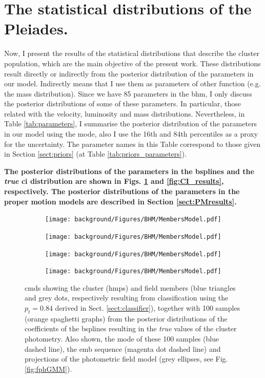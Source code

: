 \section{The statistical distributions of the Pleiades.}
Now, I present the results of the statistical distributions that describe the cluster population, which are the main objective of the present work. These distributions result directly or indirectly from the posterior distribution of the parameters in our model. Indirectly means that I use them as parameters of other function (e.g. the mass distribution). Since we have 85 parameters in the \gls{bhm}, I only discuss the posterior distributions of some of these parameters. In particular, those related with the velocity, luminosity and mass distributions. Nevertheless, in Table \ref{tab:parameters}, I summarise the posterior distribution of the parameters in our model using the mode, also I use the 16th and 84th percentiles as a proxy for the uncertainty. The parameter names in this Table correspond to those given in Section \ref{sect:priors} (at Table \ref{tab:priors_parameters}). 

\textbf{The posterior distributions of the parameters in the \glspl{bspline} and the \emph{true} \gls{ci} distribution are shown in Figs. \ref{fig:CMDs_results} and \ref{fig:CI_results}, respectively.  The posterior distributions of the parameters in the proper motion models are described in Section \ref{sect:PMresults}.}

\begin{figure}[ht!]
    \centering
    \begin{subfigure}[t]{0.48\textwidth}
        \texttt{[image: background/Figures/BHM/MembersModel.pdf]}
        \caption{}
    \end{subfigure}
    \begin{subfigure}[t]{0.48\textwidth}
      \texttt{[image: background/Figures/BHM/MembersModel.pdf]}
        \caption{}
    \end{subfigure}
     \begin{subfigure}[t]{0.48\textwidth}
      \texttt{[image: background/Figures/BHM/MembersModel.pdf]}
        \caption{}   
    \end{subfigure}
     \begin{subfigure}[t]{0.48\textwidth}
      \texttt{[image: background/Figures/BHM/MembersModel.pdf]}
        \caption{}
    \end{subfigure}
\caption{\glspl{cmd} showing the cluster (\gls{hmps}) and field members (blue triangles and grey dots, respectively resulting from classification using the $p_t = 0.84$ derived in Sect. \ref{sect:classifier}), together with 100 samples (orange spaghetti graphs) from the posterior distributions of the coefficients of the \glspl{bspline} resulting in the \emph{true} values of the cluster photometry. Also shown, the mode of these 100 samples (blue dashed line), the \gls{emb} sequence (magenta dot dashed line) and projections of the photometric field model (grey ellipses, see Fig. \ref{fig:fphGMM}).}
\label{fig:CMDs_results}
\end{figure}

